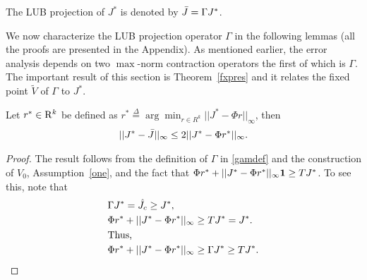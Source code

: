 \begin{definition}\label{bestproj}
The LUB projection of $J^*$ is denoted by $\bar{J}=\Gamma J^*$.
\end{definition}
We now characterize the LUB projection operator $\Gamma$ in the following lemmas (all the proofs are presented in the Appendix). As mentioned earlier, the error analysis depends on two $\max$-norm contraction operators the first of which is $\Gamma$. The important result of this section is Theorem~\ref{fxpres} and it relates the fixed point $\tilde{V}$ of $\Gamma$ to $J^*$.
\begin{lemma}\label{bestbnd}
Let $r^*\in \mathrm{R}^k$ be defined as $r^*\stackrel{\Delta}{=}\arg\min_{r\in R^k}||J^*-\Phi r||_\infty$, then 
\begin{align}
||J^*-\bar{J}||_\infty\leq 2||J^*-\Phi r^*||_\infty.
\end{align}
\end{lemma}
\begin{proof}
The result follows from the definition of $\Gamma$ in \eqref{gamdef} and the construction of $V_0$, Assumption~\ref{one}, and the fact that $\Phi r^*+||J^*-\Phi r^*||_\infty \mathbf{1}\geq TJ^*$. To see this, note that
\begin{align}
&\Gamma J^*=\hat{J}_c \geq J^*,\nonumber\\
&\Phi r^* +||J^*-\Phi r^*||_\infty\geq TJ^*= J^*.\nonumber\\
&\text{Thus,}\nonumber\\
&\Phi r^* +||J^*-\Phi r^*||_\infty\geq \Gamma J^*\geq TJ^*.
\end{align}
\end{proof}

